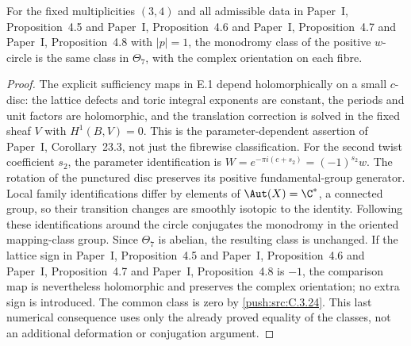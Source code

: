 \begin{proposition}\label{push:src:C.4.1}
For the fixed multiplicities $(3,4)$ and all admissible data in Paper~I, Proposition~4.5 and Paper~I, Proposition~4.6 and Paper~I, Proposition~4.7 and Paper~I, Proposition~4.8
with $|p|=1$, the monodromy class of the positive $w$-circle is the
same class in $\Theta_7$, with the complex orientation on each fibre.
\end{proposition}

\begin{proof}
The explicit sufficiency maps in E.1 depend holomorphically on a
small $c$-disc: the lattice defects and toric integral exponents are
constant, the periods and unit factors are holomorphic, and the
translation correction is solved in the fixed sheaf $V$ with
$H^1(B,V)=0$. This is the parameter-dependent assertion of Paper~I, Corollary~23.3,
not just the fibrewise classification. For the second twist
coefficient $s_2$, the parameter identification is
$W=e^{-\pi i(c+s_2)}=(-1)^{s_2}w$.
The rotation of the punctured disc preserves its positive
fundamental-group generator. Local family identifications differ
by elements of $\Aut(X)=\C^*$, a connected group, so their
transition changes are smoothly isotopic to the identity. Following
these identifications around the circle conjugates the monodromy
in the oriented mapping-class group. Since $\Theta_7$ is abelian,
the resulting class is unchanged. If the lattice sign in Paper~I, Proposition~4.5 and Paper~I, Proposition~4.6 and Paper~I, Proposition~4.7 and Paper~I, Proposition~4.8 is
$-1$, the comparison map is nevertheless holomorphic and preserves
the complex orientation; no extra sign is introduced.
The common class is zero by \ref{push:src:C.3.24}. This last numerical consequence
uses only the already proved equality of the classes, not an
additional deformation or conjugation argument.
\end{proof}

